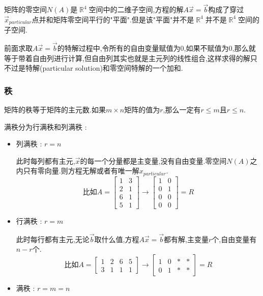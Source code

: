 \documentclass[UTF8,12pt]{ctexbook}
\DeclareMathOperator{\mathRealNumberCollection}{\mathbb{R}}
\begin{document}
{{{{{  矩阵的零空间$N(A)$是$\mathRealNumberCollection^4$空间中的二维子空间,方程的解$A\vec{x} = \vec{b}$构成了穿过$\vec{x}_{particular}$点并和矩阵零空间平行的"平面".但是该"平面"并不是$\mathRealNumberCollection^4$并不是$\mathRealNumberCollection^4$空间的子空间.

  前面求取$A\vec{x} = \vec{b}$的特解过程中,令所有的自由变量赋值为0,如果不赋值为0,那么就等于带着自由列进行计算,但自由列其实也就是主元列的线性组合,这样求得的解只不过是特解(particular solution)和零空间特解的一个加和.
}%

\subsubsection{秩}{
  矩阵的秩等于矩阵的主元数.如果$m \times n$矩阵的值为$r$,那么一定有$r \leq m$且$r \leq n$.

  满秩分为行满秩和列满秩 :
  \begin{itemize}
    \item {
          列满秩 : $r = n$

          此时每列都有主元,$\vec{x}$的每一个分量都是主变量,没有自由变量.零空间$N(A)$之内只有零向量.则方程无解或者有唯一解$x_{particular}$.
          $$
            \mbox{比如}A = \begin{bmatrix}
              1 & 3 \\
              2 & 1 \\
              6 & 1 \\
              5 & 1
            \end{bmatrix}
            \to
            \begin{bmatrix}
              1 & 0 \\
              0 & 1 \\
              0 & 0 \\
              0 & 0
            \end{bmatrix}
            =
            R
          $$
          }
    \item {
          行满秩 : $r = m$

          此时每行都有主元,无论$\vec{b}$取什么值,方程$A\vec{x} = \vec{b}$都有解,主变量$r$个,自由变量有$n - r$个.
          $$
            \mbox{比如}A = \begin{bmatrix}
              1 & 2 & 6 & 5 \\
              3 & 1 & 1 & 1
            \end{bmatrix}
            \to
            \begin{bmatrix}
              1 & 0 & * & * \\
              0 & 1 & * & *
            \end{bmatrix}
            =
            R
          $$
          }
    \item {
          满秩 : $r = m = n$

}
\end{itemize}}}}}}
\end{document}
